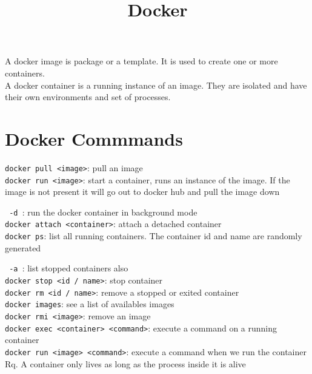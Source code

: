 \documentclass[french]{article}
\title{Docker}
\begin{document}
\date{}

\maketitle

A docker image is package or a template. It is used to create one or more containers.\\

A docker container is a running instance of an image. They are isolated and have their own environments and set of processes.

\section{Docker Commmands}

\verb|docker pull <image>|: pull an image\\

\verb|docker run <image>|: start a container, runs an instance of the image. If the image is not present it will go out to docker hub and pull the image down

\verb| -d |: run the docker container in background mode\\

\verb|docker attach <container>|: attach a detached container\\

\verb|docker ps|: list all running containers. The container id and name are randomly generated

\verb| -a |: list stopped containers also\\

\verb|docker stop <id / name>|: stop container\\

\verb|docker rm <id / name>|: remove a stopped or exited container\\

\verb|docker images|: see a list of availables images\\

\verb|docker rmi <image>|: remove an image\\

\verb|docker exec <container> <command>|: execute a command on a running container\\

\verb|docker run <image> <command>|: execute a command when we run the container\\


Rq. A container only lives as long as the process inside it is alive\\
\end{document}
